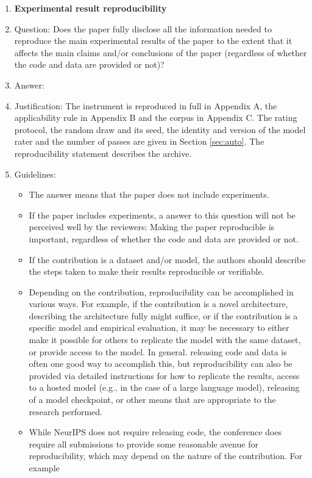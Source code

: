 \documentclass{article}
\begin{document}
\begin{enumerate}
    \item {\bf Experimental result reproducibility}
    \item[] Question: Does the paper fully disclose all the information needed to reproduce the main experimental results of the paper to the extent that it affects the main claims and/or conclusions of the paper (regardless of whether the code and data are provided or not)?
    \item[] Answer: \answerYes{}
    \item[] Justification: The instrument is reproduced in full in Appendix A, the applicability rule in Appendix B and the corpus in Appendix C. The rating protocol, the random draw and its seed, the identity and version of the model rater and the number of passes are given in Section \ref{sec:auto}. The reproducibility statement describes the archive.
    \item[] Guidelines:
    \begin{itemize}
        \item The answer \answerNA{} means that the paper does not include experiments.
        \item If the paper includes experiments, a \answerNo{} answer to this question will not be perceived well by the reviewers: Making the paper reproducible is important, regardless of whether the code and data are provided or not.
        \item If the contribution is a dataset and\slash or model, the authors should describe the steps taken to make their results reproducible or verifiable. 
        \item Depending on the contribution, reproducibility can be accomplished in various ways. For example, if the contribution is a novel architecture, describing the architecture fully might suffice, or if the contribution is a specific model and empirical evaluation, it may be necessary to either make it possible for others to replicate the model with the same dataset, or provide access to the model. In general. releasing code and data is often one good way to accomplish this, but reproducibility can also be provided via detailed instructions for how to replicate the results, access to a hosted model (e.g., in the case of a large language model), releasing of a model checkpoint, or other means that are appropriate to the research performed.
        \item While NeurIPS does not require releasing code, the conference does require all submissions to provide some reasonable avenue for reproducibility, which may depend on the nature of the contribution. For example

\end{itemize}
\end{enumerate}
\end{document}
